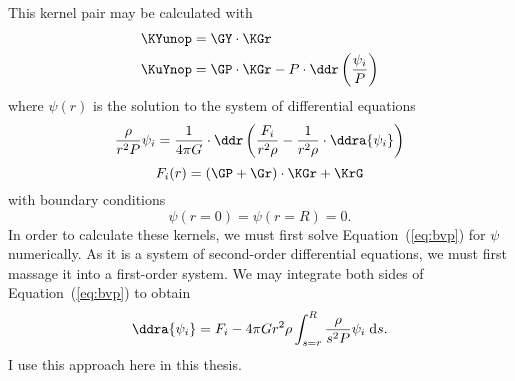 \begin{description}
\setlength{\itemindent}{0pt}
\item[Thompson--JCD Formulation.]
This kernel pair may be calculated with \citep[][their Equation~A9]{ThompsonJCD2002} 
\begin{align}
    \KYunop &= \GY \cdot \KGr
\\  \KuYnop &= \GP \cdot \KGr - P \cdot \ddr \left( \frac{\psi_i}{P} \right) \label{eq:Gough-JCD-KuY}
\end{align}
where ${\psi(r)}$ is the solution to the system of differential equations %
\begin{equation} \label{eq:bvp}
    \frac{\rho}{r^2 P}
    \psi_i
    =
    \frac{1}{4\pi G} \cdot %
    \ddr \left( 
        \frac{F_i}{r^2 \rho} 
    -
        \frac{1}{r^2 \rho} \cdot \ddra{\psi_i} 
    \right)
\end{equation}
\begin{equation}
    F_i(r) = (\GP + \Gr) \cdot \KGr + \KrG
\end{equation}
with boundary conditions
\begin{equation} \label{eq:bcs1}
    \psi(r=0) = \psi(r=R) = 0.
\end{equation}
In order to calculate these kernels, we must first solve Equation~(\ref{eq:bvp}) for $\psi$ numerically. As it is a system of second-order differential equations, we must first massage it into a first-order system. We may integrate both sides of Equation~(\ref{eq:bvp}) to obtain 
\begin{equation}
    \ddra{\psi_i} = F_i - 4\pi G r^2 \rho \int_{s=r}^R \frac{\rho}{s^2 P} \psi_i \; \text{d}s.
\end{equation}
I use this approach here in this thesis. 



\end{description}
